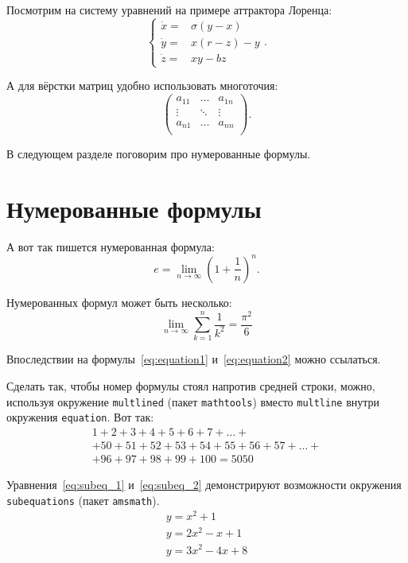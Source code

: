 \documentclass[12pt]{extreport}
\begin{document}
Посмотрим на систему уравнений на примере аттрактора Лоренца:
\[\left\{
\begin{array}{rl}
    \dot x = & \sigma (y-x)  \\
    \dot y = & x (r - z) - y \\
    \dot z = & xy - bz
\end{array}\right..\]

А для вёрстки матриц удобно использовать многоточия:
\[\left(\begin{array}{ccc}
a_{11} & \ldots & a_{1n} \\
\vdots & \ddots & \vdots \\
a_{n1} & \ldots & a_{nn} \\
\end{array} \right).\]

В следующем разделе поговорим про нумерованные формулы.
\section{Нумерованные формулы}
\label{subsec:ch1/sec3/sub3}
А вот так пишется нумерованная формула:
\begin{equation}
\label{eq:equation1}
 e = \lim_{n \to \infty} \left( 1+\frac{1}{n} \right)^n.
\end{equation}

Нумерованных формул может быть несколько:
\begin{equation}
\label{eq:equation2}
\lim_{n \to \infty} \sum_{k=1}^n \frac{1}{k^2} = \frac{\pi^2}{6}
\end{equation}

Впоследствии на формулы~\eqref{eq:equation1} и~\eqref{eq:equation2} можно ссылаться.

Сделать так, чтобы номер формулы стоял напротив средней строки, можно, используя окружение \texttt{multlined} (пакет \texttt{mathtools}) вместо \texttt{multline} внутри окружения \texttt{equation}. Вот так:
\begin{equation}
\label{eq:equation3}
\begin{multlined}
        1+ 2+3+4+5+6+7+\dots + \\
        + 50+51+52+53+54+55+56+57 + \dots + \\
        + 96+97+98+99+100=5050
\end{multlined}
\end{equation}

Уравнения~\eqref{eq:subeq_1} и~\eqref{eq:subeq_2} демонстрируют возможности окружения \texttt{subequations} (пакет \texttt{amsmath}).
\begin{subequations}
\label{eq:subeq_1}
\begin{gather}
        y = x^2 + 1\label{eq:subeq_1-1} \\
        y = 2 x^2 - x + 1\label{eq:subeq_1-2} \\
        y = 3 x^2 - 4x + 8\label{eq:subeq_1-3}
    \end{gather}
\end{subequations}
\end{document}
